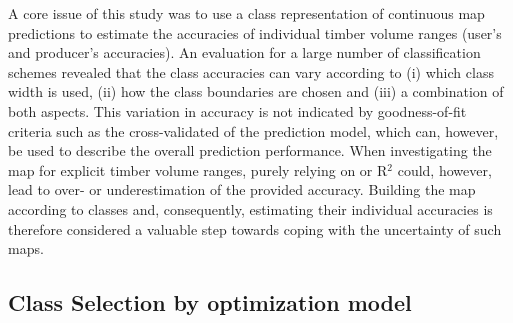 A core issue of this study was to use a class representation of continuous map predictions to estimate the accuracies of individual timber volume ranges (user's and producer's accuracies). An evaluation for a large number of classification schemes revealed that the class accuracies can vary according to (i) which class width is used, (ii) how the class boundaries are chosen and (iii) a combination of both aspects. This variation in accuracy is not indicated by goodness-of-fit criteria such as the cross-validated \rmsecv{} of the prediction model, which can, however, be used to describe the overall prediction performance. When investigating the map for explicit timber volume ranges, purely relying on \rmsecv{} or R$^2$ could, however, lead to over- or underestimation of the provided accuracy. Building the map according to classes and, consequently, estimating their individual accuracies is therefore considered a valuable step towards coping with the uncertainty of such maps.

\subsection{Class Selection by optimization model}
\label{sec:cspmod}

